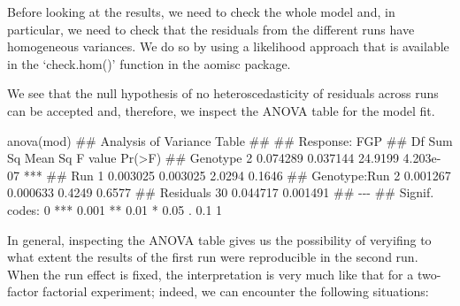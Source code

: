 \documentclass[a4paper,12pt,oneside]{book}
\newenvironment{Shaded}{\begin{snugshade}}{\end{snugshade}}
\newcommand{\SpecialCharTok}[1]{#1}
\newcommand{\DocumentationTok}[1]{#1}
\newcommand{\OtherTok}[1]{#1}
\newcommand{\FunctionTok}[1]{#1}
\newcommand{\NormalTok}[1]{#1}
\begin{document}
Before looking at the results, we need to check the whole model and, in particular, we need to check that the residuals from the different runs have homogeneous variances. We do so by using a likelihood approach that is available in the `check.hom()' function in the aomisc package.

\begin{Shaded}
\end{Shaded}

We see that the null hypothesis of no heteroscedasticity of residuals across runs can be accepted and, therefore, we inspect the ANOVA table for the model fit.

\begin{Shaded}
\begin{Highlighting}[]
\FunctionTok{anova}\NormalTok{(mod)}
\DocumentationTok{\#\# Analysis of Variance Table}
\DocumentationTok{\#\# }
\DocumentationTok{\#\# Response: FGP}
\DocumentationTok{\#\#              Df   Sum Sq  Mean Sq F value    Pr(\textgreater{}F)    }
\DocumentationTok{\#\# Genotype      2 0.074289 0.037144 24.9199 4.203e{-}07 ***}
\DocumentationTok{\#\# Run           1 0.003025 0.003025  2.0294    0.1646    }
\DocumentationTok{\#\# Genotype:Run  2 0.001267 0.000633  0.4249    0.6577    }
\DocumentationTok{\#\# Residuals    30 0.044717 0.001491                      }
\DocumentationTok{\#\# {-}{-}{-}}
\DocumentationTok{\#\# Signif. codes:  0 \textquotesingle{}***\textquotesingle{} 0.001 \textquotesingle{}**\textquotesingle{} 0.01 \textquotesingle{}*\textquotesingle{} 0.05 \textquotesingle{}.\textquotesingle{} 0.1 \textquotesingle{} \textquotesingle{} 1}
\end{Highlighting}
\end{Shaded}

In general, inspecting the ANOVA table gives us the possibility of veryifing to what extent the results of the first run were reproducible in the second run. When the run effect is fixed, the interpretation is very much like that for a two-factor factorial experiment; indeed, we can encounter the following situations:
\end{document}

